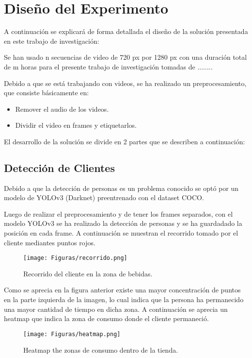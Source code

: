 \documentclass[conference]{IEEEtran}
\begin{document}
\section{Diseño del Experimento}
A continuación se explicará de forma detallada el diseño de la solución presentada en este trabajo de investigación:

Se han usado n secuencias de video  de 720 px por 1280 px con una duración total de m horas para el presente trabajo de investigación tomadas de ........

Debido a que se está trabajando con videos, se ha realizado un preprocesamiento, que consiste básicamente en:
\begin{itemize}
\item Remover el audio de los videos.
\item Dividir el video en frames y etiquetarlos.
\end{itemize}

El desarrollo de la solución se divide en 2 partes que se describen a continuación:
\subsection{Detección de Clientes}
Debido a que la detección de personas es un problema conocido se optó por un modelo de YOLOv3 (Darknet) preentrenado con el dataset COCO.

Luego de realizar el preprocesamiento y de tener los frames separados, con el modelo YOLOv3 se ha realizado la detección de personas y se ha guardadado la posición en cada frame. A continuación se muestran el recorrido tomado por el cliente mediantes puntos rojos.
\begin{figure}[hbtp]
\centering
\texttt{[image: Figuras/recorrido.png]}
\caption{Recorrido del cliente en la zona de bebidas.}
\label{fig:yolo}
\end{figure}

Como se aprecia en la figura anterior existe una mayor concentración de puntos en la parte izquierda de la imagen, lo cual indica que la persona ha permanecido una mayor cantidad de tiempo en dicha zona. A continuación se aprecia un heatmap que indica la zona de consumo donde el cliente permaneció.

\begin{figure}[hbtp]
\centering
\texttt{[image: Figuras/heatmap.png]}
\caption{Heatmap the zonas de consumo dentro de la tienda.}
\label{fig:yolo}
\end{figure}
\end{document}
